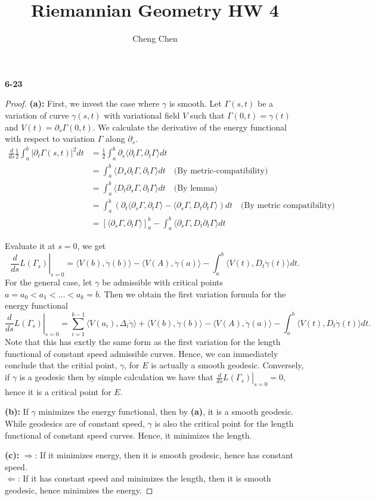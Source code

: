 \documentclass[11pt, a4paper]{article}
\title{Riemannian Geometry HW 4}
\author{Cheng Chen}
\date{}
\theoremstyle{plain}
\theoremstyle{definition}
\theoremstyle{remark}
\begin{document}
\maketitle

\newcommand{\Gm}{\Gamma}
\newcommand{\gm}{\gamma}
\newcommand{\p}{\partial}
\newcommand{\mt}[1]{\langle #1 \rangle}
\newcommand{\dgm}{\dot\gm}

\noindent\textbf{6-23}
\begin{proof}
    \textbf{(a):} 
    First, we invest the case where $\gm$ is smooth. Let $\Gm(s,t)$ be a variation of curve $\gm(s,t)$ with variational field $V$ such that $\Gm(0,t) = \gamma(t)$ and
    $V(t) = \p_s \Gm(0,t)$.
    We calculate the derivative of the energy functional with respect to variation $\Gm$ along $\p_s$.
    \begin{align*}
        \frac{d}{ds} \frac{1}{2}\int_a^b |\p_t \Gm(s,t)|^2dt &= \frac{1}{2} \int_a^b \p_s\mt{\p_t\Gm,\p_t\Gm}dt\\
        &= \int_a^b \mt{D_s\p_t\Gm,\p_t\Gm}dt \quad\text{(By metric-compatibility)}\\
        &= \int_a^b \mt{D_t\p_s\Gm,\p_t\Gm}dt \quad\text{(By lemma)}\\
        &= \int_a^b \left(\p_t\mt{\p_s\Gm,\p_t\Gm} - \mt{\p_s\Gm,D_t\p_t\Gm}\right)dt\quad \text{(By metric compatibility)}\\
        &= \left[\mt{\p_s\Gm,\p_t\Gm}\right]_a^b - \int_a^b\mt{\p_s\Gm,D_t\p_t\Gm}dt
    \end{align*}
    
    Evaluate it at $s=0$, we get
    \[
        \left.\frac{d}{ds}L(\Gm_s)\right|_{s=0} = \mt{V(b),\dot\gm(b)} - \mt{V(A),\dot\gm(a)} - \int_a^b \mt{V(t),D_t \dot\gm(t)} dt.
    \]
    For the general case, let $\gm$ be admissible with critical points $a=a_0 < a_1 < ... < a_k = b$. Then we obtain the first variation
    formula for the energy functional
    \[
        \left.\frac{d}{ds}L(\Gm_s)\right|_{s=0} = \sum_{i=1}^{k-1}\mt{V(a_i),\Delta_i\dgm} + \mt{V(b),\dot\gm(b)} - \mt{V(A),\dot\gm(a)} - \int_a^b \mt{V(t),D_t \dot\gm(t)} dt.
    \]
    Note that this has exctly the same form as the first variation for the length functional of constant speed admissible curves. Hence, we can immediately conclude that 
    the critial point, $\gm$, for $E$ is actually a smooth geodesic. Conversely, if $\gm$ is a geodesic then by simple calculation we
    have that $\left.\frac{d}{ds}L(\Gm_s)\right|_{s=0} =0$, hence it is a critical point for $E$.

    \textbf{(b):} If $\gm$ minimizes the energy functional, then by \textbf{(a)}, it is a smooth geodesic. While geodesics are of constant
    speed, $\gm$ is also the critical point for the length functional of constant speed curves. Hence, it minimizes the length.

    \textbf{(c):} $\Rightarrow$: If it minimizes energy, then it is smooth geodesic, hence has constant speed.\\
    $\Leftarrow$: If it has constant speed and minimizes the length, then it is smooth geodesic, hence minimizes the energy.
\end{proof}
\end{document}
